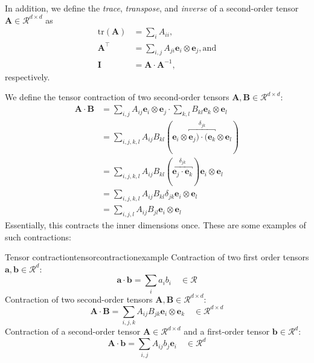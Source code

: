 In addition, we define the \emph{trace}, \emph{transpose}, and \emph{inverse} of a second-order tensor $\mathbf{A} \in \mathcal{R}^{d \times d}$ as 
\begin{align}
    \textrm{tr}(\mathbf{A}) &= \sum_{i} A_{ii}, \\
    \mathbf{A}^\top &= \sum_{i,j} A_{ji} \mathbf{e}_i \otimes \mathbf{e}_j, \textrm{and}\\
    \pmb{I} &= \mathbf{A} \cdot \mathbf{A}^{-1} ,
\end{align}
respectively.

We define the tensor contraction of two second-order tensors $\mathbf{A},\mathbf{B} \in \mathcal{R}^{d \times d}$: 
\begin{align}
    \mathbf{A} \cdot \mathbf{B} 
        &= \sum_{i,j} A_{ij} \mathbf{e}_i \otimes \mathbf{e}_j \cdot \sum_{k,l}B_{kl} \mathbf{e}_k \otimes \mathbf{e}_l \\
        &= \sum_{i,j,k,l} A_{ij} B_{kl} (\mathbf{e}_i \otimes \overbracket{\mathbf{e}_j) \cdot  (\mathbf{e}_k}^{\delta_{jk}} \otimes \mathbf{e}_l) \\
        &= \sum_{i,j,k,l} A_{ij} B_{kl} (\overbracket{\mathbf{e}_j \cdot  \mathbf{e}_k}^{\delta_{jk}}) \mathbf{e}_i \otimes \mathbf{e}_l \\
        &= \sum_{i,j,k,l} A_{ij}B_{kl} \delta_{jk} \mathbf{e}_i \otimes \mathbf{e}_l \\
        &= \sum_{i,j,l} A_{ij}B_{jl} \mathbf{e}_i \otimes \mathbf{e}_l
\end{align}
Essentially, this contracts the inner dimensions once. These are some examples of such contractions:

\begin{example}{Tensor contraction}{tensorcontractionexample}
    Contraction of two first order tensors $\mathbf{a},\mathbf{b} \in \mathcal{R}^d$: 
    \begin{equation}
        \mathbf{a} \cdot \mathbf{b} = \sum_i a_i b_i \quad \in \mathcal{R}
    \end{equation}
    Contraction of two second-order tensors $\mathbf{A},\mathbf{B} \in \mathcal{R}^{d \times d}$: 
    \begin{equation}
        \mathbf{A} \cdot \mathbf{B} = \sum_{i,j,k} A_{ij} B_{jk} \mathbf{e}_i \otimes \mathbf{e}_k \quad \in \mathcal{R}^{d \times d}
    \end{equation}
    Contraction of a second-order tensor $\mathbf{A} \in \mathcal{R}^{d \times d}$ and a first-order tensor $\mathbf{b} \in \mathcal{R}^d$: 
    \begin{equation}
        \mathbf{A} \cdot \mathbf{b} = \sum_{i,j} A_{ij} b_j \mathbf{e}_i \quad \in \mathcal{R}^d
    \end{equation}
\end{example}

